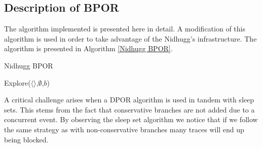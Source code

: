 \subsection{Description of BPOR}
The algorithm implemented is presented here \cite{BPOR} in detail. A modification of this algorithm is used in order to take advantage of the Nidhugg's infrastructure.
The algorithm is presented in Algorithm \ref{Nidhugg BPOR}.


\begin{algorithm}
    \caption{Nidhugg BPOR}
    \label{Nidhugg BPOR}
    Explore($\langle \rangle$,$\emptyset$,$b$)\;
\end{algorithm}

A critical challenge arises when a DPOR algorithm is used in tandem with sleep sets. This stems from the fact that conservative branches are not added due to a
concurrent event. By observing the sleep set algorithm we notice that if we follow the same strategy as with non-conservative branches many traces will end up being blocked.

